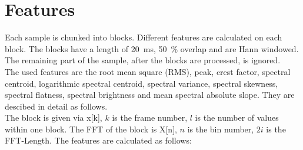 \section{Features}
\label{sec:Features}
Each sample is chunked into blocks. Different features are calculated on each block. The blocks have a length of 20~ms, 50~\% overlap and are Hann windowed. The remaining part of the sample, after the blocks are processed, is ignored.\\
The used features are the root mean square (RMS), peak, crest factor, spectral centroid, logarithmic spectral centroid, spectral variance, spectral skewness, spectral flatness, spectral brightness and mean spectral absolute slope. They are descibed in detail as follows.\\
The block is given via x[k], $k$ is the frame number, $l$ is the number of values within one block. The FFT of the block is X[n], $n$ is the bin number, $2 i$ is the FFT-Length. The features are calculated as follows:
